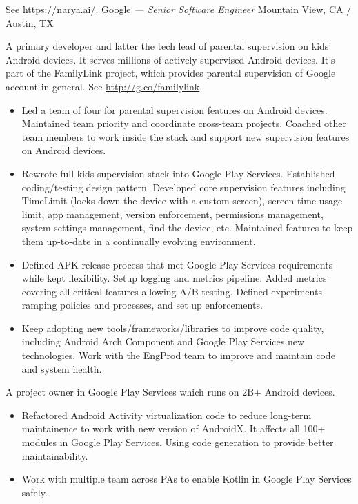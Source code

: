 \documentclass[]{friggeri-cv} %
\begin{document}
\begin{entrylist}
{    See \url{https://narya.ai/}.
  }
  {Google \emph{--- Senior Software Engineer}}
  {Mountain View, CA / Austin, TX}
  {
    A primary developer and latter the tech lead of parental supervision on kids' Android devices.
    It serves millions of actively supervised Android devices.
    It's part of the FamilyLink project, which provides parental supervision of Google account in general.
    See \url{http://g.co/familylink}.
    \begin{itemize}
      \item Led a team of four for parental supervision features on Android devices.
      Maintained team priority and coordinate cross-team projects.
      Coached other team members to work inside the stack and support new supervision features on Android devices.
      \item Rewrote full kids supervision stack into Google Play Services.
      Established coding/testing design pattern.
      Developed core supervision features including TimeLimit (locks down the device with a custom screen),
      screen time usage limit, app management, version enforcement, permissions management, system settings management, find the device, etc.
      Maintained features to keep them up-to-date in a continually evolving environment.
      \item Defined APK release process that met Google Play Services requirements while kept flexibility.
      Setup logging and metrics pipeline.
      Added metrics covering all critical features allowing A/B testing.
      Defined experiments ramping policies and processes, and set up enforcements.
      \item Keep adopting new tools/frameworks/libraries to improve code quality,
      including Android Arch Component and Google Play Services new technologies.
      Work with the EngProd team to improve and maintain code and system health.
    \end{itemize}
    A project owner in Google Play Services which runs on 2B+ Android devices.
    \begin{itemize}
      \item Refactored Android Activity virtualization code to reduce long-term maintainence to work with new version of AndroidX.
      It affects all 100+ modules in Google Play Services.
      Using code generation to provide better maintainability.
      \item Work with multiple team across PAs to enable Kotlin in Google Play Services safely.
    \end{itemize}
  }
  \end{entrylist}
\end{document}
